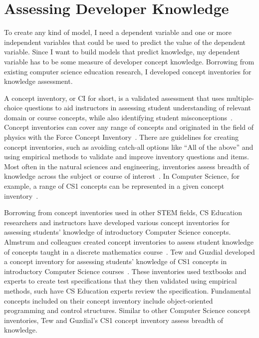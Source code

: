 \chapter{Assessing Developer Knowledge}
\label{chap:assess}

To create any kind of model, I need a dependent variable and one or more independent variables that could be used to predict the value of the dependent variable. Since I want to build models that predict knowledge, my dependent variable has to be some measure of developer concept knowledge.
Borrowing from existing computer science education research, I developed concept inventories for knowledge assessment. 

A concept inventory, or CI for short, is a validated assessment that uses multiple-choice questions to aid instructors in assessing student understanding of relevant domain or course concepts, while also identifying student misconceptions~\cite{evans2003progress}. Concept inventories can cover any range of concepts and originated in the field of physics with the Force Concept Inventory~\cite{hestenes1992force}. There are guidelines for creating concept inventories, such as avoiding catch-all options like ``All of the above'' and using empirical methods to validate and improve inventory questions and items. Most often in the natural sciences and engineering, inventories assess breadth of knowledge across the subject or course of interest~\cite{evans2003progress}. In Computer Science, for example, a range of CS1 concepts can be represented in a given concept inventory~\cite{tew2010developing}.

Borrowing from concept inventories used in other STEM fields, CS Education researchers and instructors have developed various concept inventories for assessing students' knowledge of introductory Computer Science concepts\cite{almstrum2006concept, krone2010reasoning,tew2010assessing}. Almstrum and colleagues created concept inventories to assess student knowledge of concepts taught in a discrete mathematics course~\cite{almstrum2006concept}. 
Tew and Guzdial developed a concept inventory for assessing students' knowledge of CS1 concepts in introductory Computer Science courses~\cite{tew2010assessing, tew2010developing}. These inventories used textbooks and experts to create test specifications that they then validated using empirical methods, such have CS Education experts review the specification. Fundamental concepts included on their concept inventory include object-oriented programming and control structures. Similar to other Computer Science concept inventories, Tew and Guzdial's CS1 concept inventory assess breadth of knowledge. 
	
